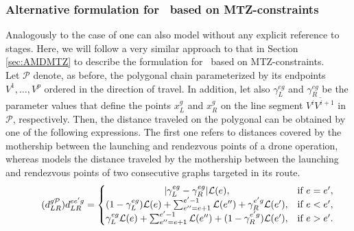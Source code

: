 \subsubsection{Alternative formulation for \PMD \  based on MTZ-constraints}
\noindent
Analogously to the case of \AMD\xspace one can also model \PMD\xspace without any explicit reference to stages. Here, we will follow a very similar approach to that in Section \ref{sec:AMDMTZ} to describe the formulation for \PMD \ based on MTZ-constraints.\\
\noindent
Let $\mathcal P$ denote, as before,  the polygonal chain parameterized by its endpoints $V^1, \ldots, V^p$ ordered in the direction of travel. In addition, let also $\gamma_{L}^{eg}$ and $\gamma_{R}^{eg}$ be the parameter values that define the points $x_L^g$ and $x_R^g$ on the line segment $\overline{V^iV^{i+1}}$ in $\mathcal P$, respectively. Then, the distance traveled on the polygonal can be obtained by one of  the following expressions. The first one refers to distances covered by the mothership between the launching and rendezvous points of a drone operation, whereas models the distance traveled by the mothership between the launching and rendezvous points of two consecutive graphs targeted in its route.
\begin{equation}\tag{$d_{LR}^{g\mathcal P}$}\label{eq:dLRPg}
d_{LR}^{ee'g} = \left\{\begin{matrix}
|\gamma_{L}^{eg} - \gamma_{R}^{eg}|\mathcal L(e), & \text{if } e = e',\\
(1 - \gamma_{L}^{eg})\mathcal L(e) + \sum_{e'' =e+1}^{e'-1}\mathcal L(e'') + \gamma_{R}^{e'g}\mathcal L(e'), & \text{if } e < e', \\
\gamma_{L}^{eg}\mathcal L(e) + \sum_{e'' = e+1}^{e'-1}\mathcal L(e'') + (1-\gamma_{R}^{e'g})\mathcal L(e'), & \text{if } e > e'.
\end{matrix}\right.
\end{equation}

